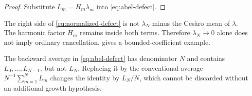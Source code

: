 \begin{proof}
Substitute \(L_m=H_m\lambda_m\) into
\eqref{eq:abel-defect}.
\end{proof}

\begin{remark}
\label{rem:normalization-not-cosmetic}
The right side of \eqref{eq:normalized-defect} is not
\(\lambda_N\) minus the Ces\`aro mean of \(\lambda\).  The harmonic
factor \(H_m\) remains inside both terms.  Therefore
\(\lambda_N\to0\) alone does not imply ordinary cancellation.
 gives a bounded-coefficient example.
\end{remark}

\begin{remark}[Indexing]
\label{rem:indexing}
The backward average in \eqref{eq:abel-defect} has denominator \(N\)
and contains \(L_0,\ldots,L_{N-1}\), but not \(L_N\).  Replacing it
by the conventional average \(N^{-1}\sum_{m=1}^NL_m\) changes the
identity by \(L_N/N\), which cannot be discarded without an
additional growth hypothesis.
\end{remark}
